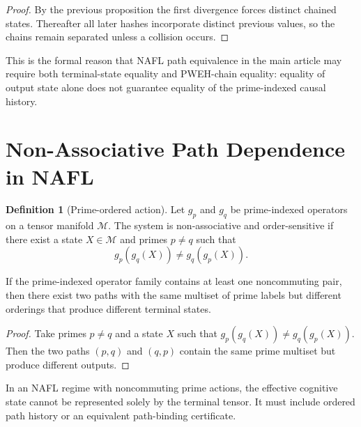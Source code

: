\documentclass[12pt,a4paper]{article}
\theoremstyle{definition}
\newtheorem{definition}{Definition}[section]
\theoremstyle{plain}
\theoremstyle{remark}
\begin{document}
\begin{proof}
By the previous proposition the first divergence forces distinct chained states.
Thereafter all later hashes incorporate distinct previous values, so the chains
remain separated unless a collision occurs.
\end{proof}

\begin{claimbox}
This is the formal reason that NAFL path equivalence in the main article may
require both terminal-state equality and PWEH-chain equality: equality of output
state alone does not guarantee equality of the prime-indexed causal history.
\end{claimbox}

\section{Non-Associative Path Dependence in NAFL}

\begin{definition}[Prime-ordered action]
Let $g_p$ and $g_q$ be prime-indexed operators on a tensor manifold $\mathcal{M}$.
The system is non-associative and order-sensitive if there exist a state
$X\in\mathcal{M}$ and primes $p\neq q$ such that
\begin{equation}
g_p(g_q(X)) \neq g_q(g_p(X)).
\end{equation}
\end{definition}

\begin{proposition}
If the prime-indexed operator family contains at least one noncommuting pair,
then there exist two paths with the same multiset of prime labels but different
orderings that produce different terminal states.
\end{proposition}

\begin{proof}
Take primes $p\neq q$ and a state $X$ such that
$g_p(g_q(X)) \neq g_q(g_p(X))$. Then the two paths $(p,q)$ and $(q,p)$ contain
the same prime multiset but produce different outputs.
\end{proof}

\begin{corollary}
In an NAFL regime with noncommuting prime actions, the effective cognitive state
cannot be represented solely by the terminal tensor. It must include ordered path
history or an equivalent path-binding certificate.
\end{corollary}
\end{document}
